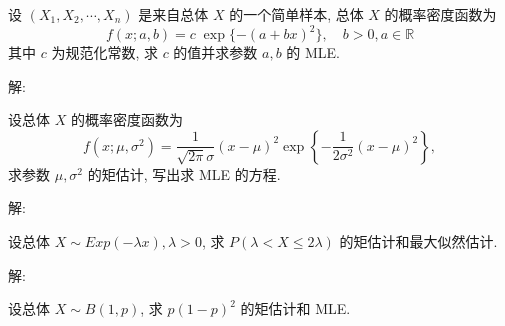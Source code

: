 \documentclass[standard]{ExBook}
\begin{document}
\begin{qitems}
    \begin{bbox}
    \begin{shaded}
        \qitem
设 \((X_1, X_2, \cdots, X_n)\) 是来自总体 \(X\) 的一个简单样本, 总体 \(X\) 的概率密度函数为
\[f(x; a, b) = c \; \exp\{-(a + bx)^2\}, \quad b > 0, a \in \mathbb{R}\]
其中 \(c\) 为规范化常数, 求 \(c\) 的值并求参数 \(a, b\) 的 MLE.
    \end{shaded}
    \end{bbox}

\vspace{-5em}

    \begin{bbox}
解: 
    \end{bbox}

\vspace{-5em}

    \begin{bbox}
    \begin{shaded}
        \qitem
设总体 \(X\) 的概率密度函数为
\[f(x; \mu, \sigma^2) = \frac{1}{\sqrt{2\pi}\sigma}(x - \mu)^2 \exp\left\{-\frac{1}{2\sigma^2}(x - \mu)^2\right\},\]
求参数 \(\mu, \sigma^2\) 的矩估计, 写出求 MLE 的方程.
    \end{shaded}
    \end{bbox}

\vspace{-5em}

    \begin{bbox}
解: 
    \end{bbox}

\vspace{-5em}

    \begin{bbox}
    \begin{shaded}
        \qitem
设总体 \(X \sim Exp(-\lambda x), \lambda > 0\), 求 \(P(\lambda < X \leq 2\lambda)\) 的矩估计和最大似然估计.
    \end{shaded}
    \end{bbox}

\vspace{-5em}

    \begin{bbox}
解: 
    \end{bbox}

\vspace{-5em}

    \begin{bbox}
    \begin{shaded}
        \qitem
设总体 \(X \sim B(1, p)\), 求 \(p(1 - p)^2\) 的矩估计和 MLE.
    \end{shaded}
    \end{bbox}


\end{qitems}
\end{document}

